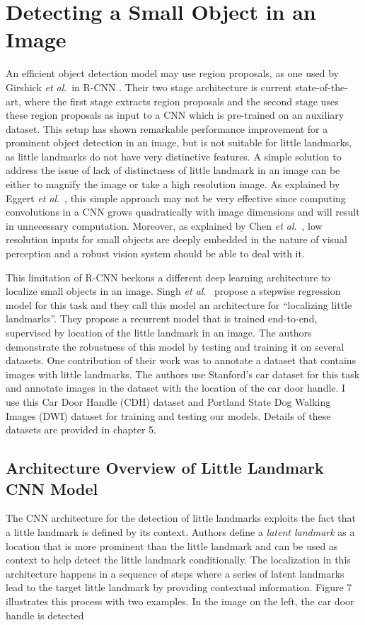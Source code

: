 \documentclass [11pt,letterpaper ,twoside ,openany ]{report}
\begin{document}
    \chapter{Detecting a Small Object in an Image}
    \doublespacing
    An efficient object detection model may use region proposals, as  one used by Girshick \textit{et al}.\ in R-CNN \cite{girshick2014rich, ren2015faster}. Their two stage architecture is current state-of-the-art, where the first stage extracts region proposals and the second stage uses these region proposals as input to a CNN which is pre-trained on an auxiliary dataset. This setup has shown remarkable performance improvement for a prominent object detection in an image, but is not suitable for little landmarks, as little landmarks do not have very distinctive features. A simple solution to address the issue of lack of distinctness of little landmark in an image can be either to magnify the image or take a high resolution image. As explained by Eggert \textit{et al}.\ \cite{eggert2017improving}, this simple approach may not be very effective since computing convolutions in a CNN grows quadratically with image dimensions and will result in unnecessary computation. Moreover, as explained by Chen \textit{et al}.\ \cite{chen2016r}, low resolution inputs for small objects are deeply embedded  in the nature of visual perception and a robust vision system should be able to deal with it.
        
    This limitation of R-CNN beckons a different deep learning architecture to localize small objects in an image. Singh \textit{et al}.\ \cite{Singh_2016_CVPR} propose a stepwise regression model for this task and they call this model an architecture for ``localizing little landmarks''. They propose a recurrent model that is trained end-to-end, supervised by location of the little landmark in an image. The authors demonstrate the robustness of this model by testing and training it on several datasets. One contribution of their work was to annotate a dataset that contains images with little landmarks. The authors use Stanford's car dataset \cite{krause20133d} for this task and annotate images in the dataset with the location of the car door handle. I use this Car Door Handle (CDH) dataset and Portland State Dog Walking Images (DWI) dataset for training and testing our models. Details of these datasets are provided in chapter 5.

    \section{Architecture Overview of Little Landmark CNN Model}
    The CNN architecture for the detection of little landmarks \cite{Singh_2016_CVPR} exploits the fact that a little landmark is defined by its context. Authors define a \textit {latent landmark} as a location that is more prominent than the little landmark and can be used as context to help detect the little landmark conditionally. The localization in this architecture happens in a sequence of steps where a series of latent landmarks lead to the target little landmark by providing contextual information. Figure 7 illustrates this process with two examples. In the image on the left, the car door handle is detected
\end{document}
